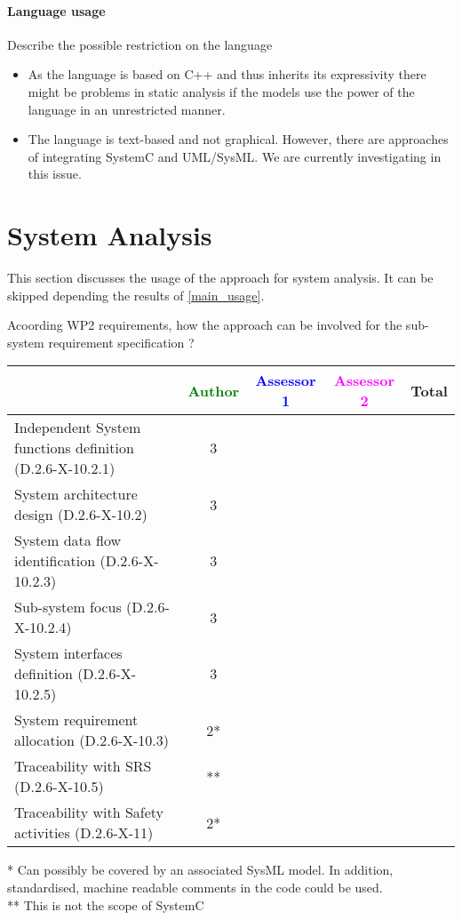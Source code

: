 \paragraph{Language usage} Describe the possible restriction on the language

\begin{itemize}
\item As the language is based on C++ and thus inherits its expressivity there might be problems in static analysis if the models use the power of the language in an unrestricted manner.
\item The language is text-based and not graphical. However, there are approaches of integrating SystemC and UML/SysML. We are currently investigating in this issue.
\end{itemize}


\section{System Analysis}
This section discusses the usage of the approach for system analysis.
It can be skipped depending the results of \ref{main_usage}.

Acoording WP2 requirements, how the approach can be involved for the sub-system requirement specification ?

\begin{tabular}{|l | c | c | c | c|}
\hline
& \textcolor{green}{Author} & \textcolor{blue}{Assessor 1} & \textcolor{magenta}{Assessor 2} & Total \\
\hline
Independent System functions definition (D.2.6-X-10.2.1)  &3 & & &  \\
\hline 
System architecture design (D.2.6-X-10.2) &3 & & &  \\
\hline
System data flow identification (D.2.6-X-10.2.3)  &3 & & &  \\
\hline
Sub-system focus (D.2.6-X-10.2.4)  &3 & & &  \\
\hline
System interfaces definition (D.2.6-X-10.2.5)  &3 & & &  \\
\hline
System requirement allocation (D.2.6-X-10.3)  &2* & & &  \\
\hline
Traceability with SRS (D.2.6-X-10.5)  &** & & &  \\
\hline
Traceability with Safety activities (D.2.6-X-11)  &2* & & &  \\
\hline
\end{tabular}

\begin{author_comment}
* Can possibly be covered by an associated SysML model. In addition, standardised, machine readable comments in the code could be used.\\
** This is not the scope of SystemC
\end{author_comment}

